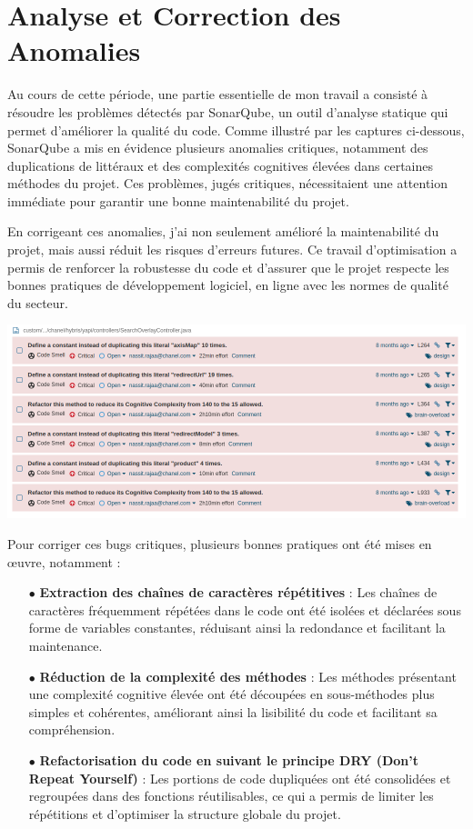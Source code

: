 \section{Analyse et Correction des Anomalies}

Au cours de cette période, une partie essentielle de mon travail a consisté à résoudre les problèmes détectés par SonarQube, un outil d'analyse statique qui permet d'améliorer la qualité du code. Comme illustré par les captures ci-dessous, SonarQube a mis en évidence plusieurs anomalies critiques, notamment des  duplications de littéraux  et des  complexités cognitives  élevées dans certaines méthodes du projet. Ces problèmes, jugés critiques, nécessitaient une attention immédiate pour garantir une bonne maintenabilité du projet.

En corrigeant ces anomalies, j'ai non seulement amélioré la maintenabilité du projet, mais aussi réduit les risques d'erreurs futures. Ce travail d'optimisation a permis de renforcer la  robustesse  du code et d'assurer que le projet respecte les bonnes pratiques de développement logiciel, en ligne avec les normes de qualité du secteur.
\begin{center}
    \centering
    \includegraphics[width=19cm]{Figures/Screens/bug.png}
    \label{fig:corr}
\end{center}
Pour corriger ces bugs critiques, plusieurs bonnes pratiques ont été mises en œuvre, notamment :

\begin{itemize}
    \item[$\bullet$] \textbf{Extraction des chaînes de caractères répétitives} : Les chaînes de caractères fréquemment répétées dans le code ont été isolées et déclarées sous forme de variables constantes, réduisant ainsi la redondance et facilitant la maintenance.
    \item[$\bullet$] \textbf{Réduction de la complexité des méthodes} : Les méthodes présentant une complexité cognitive élevée ont été découpées en sous-méthodes plus simples et cohérentes, améliorant ainsi la lisibilité du code et facilitant sa compréhension.
    \item[$\bullet$] \textbf{Refactorisation du code en suivant le principe DRY (Don't Repeat Yourself)} : Les portions de code dupliquées ont été consolidées et regroupées dans des fonctions réutilisables, ce qui a permis de limiter les répétitions et d'optimiser la structure globale du projet.
\end{itemize}

